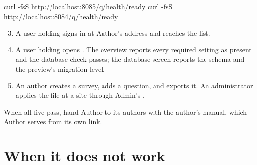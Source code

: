 \documentclass[11pt, a4paper]{article}
\begin{document}
\begin{elicitcmd}
curl -fsS http://localhost:8085/q/health/ready
curl -fsS http://localhost:8084/q/health/ready
\end{elicitcmd}

\begin{enumerate}
  \setcounter{enumi}{2}
  \item A user holding  signs in at Author's address and reaches the
         list.
  \item A user holding  opens . The overview reports every
        required setting as present and the database check passes; the database screen
        reports the  schema and the preview's migration level.
  \item An author creates a survey, adds a question, and exports it. An administrator applies
        the file at a site through Admin's .
\end{enumerate}

When all five pass, hand Author to its authors with the author's manual, which Author serves
from its own  link.

\section{When it does not work}
\label{sec:trouble}
\end{document}
